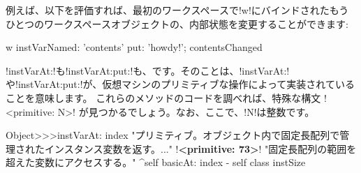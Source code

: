 \documentclass[a4paper,10pt,twoside]{book}
\begin{document}
例えば、以下を評価すれば、最初のワークスペースで\ct!w!にバインドされたもうひとつのワークスペースオブジェクトの、内部状態を変更することができます:
\begin{code}{}
w instVarNamed: 'contents' put: 'howdy!'; contentsChanged
\end{code}


\ct!instVarAt:!も\ct!instVarAt:put:!も、です。そのことは、\ct!instVarAt:!や\ct!instVarAt:put:!が、\pharo 仮想マシンのプリミティブな操作によって実装されていることを意味します。
これらのメソッドのコードを調べれば、特殊な構文 \ct!<primitive: N>! が見つかるでしょう。なお、ここで、\ct!N!は整数です。

\begin{code}{}
Object>>>instVarAt: index 
	"プリミティブ。オブジェクト内で固定長配列で管理されたインスタンス変数を返す。..."
	!\textbf{<primitive: 73>}!
	"固定長配列の範囲を超えた変数にアクセスする。"
	^self basicAt: index - self class instSize		
\end{code}
\end{document}
